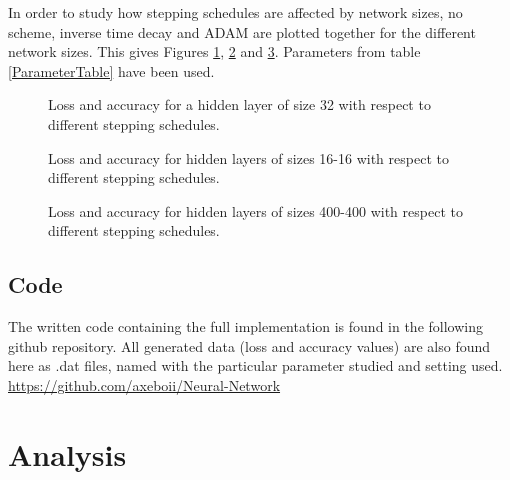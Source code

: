 \documentclass{article}
\begin{document}
\noindent In order to study how stepping schedules are affected by network sizes, no scheme, inverse time decay and ADAM are plotted together for the different network sizes. This gives Figures \ref{32compare3}, \ref{16compare3} and \ref{400compare3}. Parameters from table \ref{ParameterTable} have been used. 
\begin{figure}[H]
  \centering
  \hfill
  \caption{Loss and accuracy for a hidden layer of size 32 with respect to different stepping schedules.}
  \label{32compare3}
\end{figure}
\begin{figure}[H]
  \centering
  \hfill
  \caption{Loss and accuracy for hidden layers of sizes 16-16 with respect to different stepping schedules.}
  \label{16compare3}
\end{figure}
\begin{figure}[H]
  \centering
  \hfill
  \caption{Loss and accuracy for hidden layers of sizes 400-400 with respect to different stepping schedules.}
  \label{400compare3}
\end{figure}

\subsection{Code}\label{sec: code}
The written code containing the full implementation is found in the following github repository. All generated data (loss and accuracy values) are also found here as .dat files, named with the particular parameter studied and setting used.\\
\url{https://github.com/axeboii/Neural-Network}

\section{Analysis}
\end{document}

